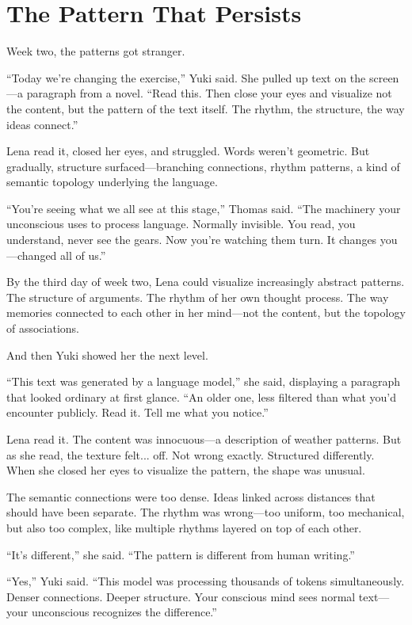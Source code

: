 \chapter{The Pattern That Persists}

Week two, the patterns got stranger.

``Today we're changing the exercise,'' Yuki said. She pulled up text on the screen—a paragraph from a novel. ``Read this. Then close your eyes and visualize not the content, but the pattern of the text itself. The rhythm, the structure, the way ideas connect.''

Lena read it, closed her eyes, and struggled. Words weren't geometric. But gradually, structure surfaced—branching connections, rhythm patterns, a kind of semantic topology underlying the language.

``You're seeing what we all see at this stage,'' Thomas said. ``The machinery your unconscious uses to process language. Normally invisible. You read, you understand, never see the gears. Now you're watching them turn. It changes you—changed all of us.''

By the third day of week two, Lena could visualize increasingly abstract patterns. The structure of arguments. The rhythm of her own thought process. The way memories connected to each other in her mind—not the content, but the topology of associations.

And then Yuki showed her the next level.

``This text was generated by a language model,'' she said, displaying a paragraph that looked ordinary at first glance. ``An older one, less filtered than what you'd encounter publicly. Read it. Tell me what you notice.''

Lena read it. The content was innocuous—a description of weather patterns. But as she read, the texture felt... off. Not wrong exactly. Structured differently. When she closed her eyes to visualize the pattern, the shape was unusual.

The semantic connections were too dense. Ideas linked across distances that should have been separate. The rhythm was wrong—too uniform, too mechanical, but also too complex, like multiple rhythms layered on top of each other.

``It's different,'' she said. ``The pattern is different from human writing.''

``Yes,'' Yuki said. ``This model was processing thousands of tokens simultaneously. Denser connections. Deeper structure. Your conscious mind sees normal text—your unconscious recognizes the difference.''

